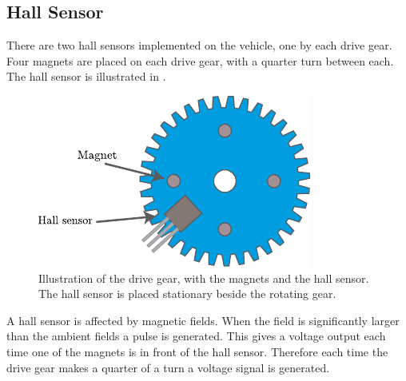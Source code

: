 \subsection{Hall Sensor}
There are two hall sensors implemented on the vehicle, one by each drive gear. Four magnets are placed on each drive gear, with a quarter turn between each. The hall sensor is illustrated in .

\begin{figure}[H]
	\centering
	\includegraphics[scale=1.2]{figures/hallSensorDrawing.pdf}
	\caption{Illustration of the drive gear, with the magnets and the hall sensor. The hall sensor is placed stationary beside the rotating gear\cite{KHSoerensen}.}
	\label{HallSensor}
\end{figure}
%
A hall sensor is affected by magnetic fields. When the field is significantly larger than the ambient fields a pulse is generated. This gives a voltage output each time one of the magnets is in front of the hall sensor. Therefore each time the drive gear makes a quarter of a turn a voltage signal is generated.

%
%
